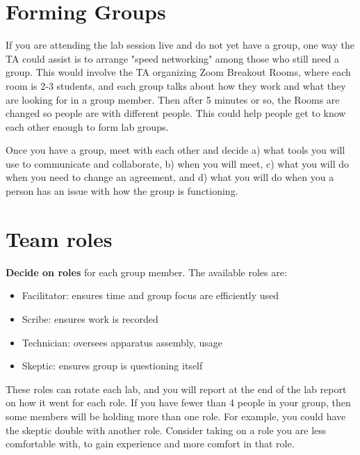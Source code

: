 \section{Forming Groups}

If you are attending the lab session live and do not yet have a group, one way the TA could assist is to arrange "speed networking" among those who still need a group. This would involve the TA organizing Zoom Breakout Rooms, where each room is 2-3 students, and each group talks about how they work and what they are looking for in a group member. Then after 5 minutes or so, the Rooms are changed so people are with different people. This could help people get to know each other enough to form lab groups.

\begin{steps}
	\item Once you have a group, meet with each other and decide a) what tools you will use to communicate and collaborate, b) when you will meet, c) what you will do when you need to change an agreement, and d) what you will do when you a person has an issue with how the group is functioning.
\end{steps}

\section{Team roles}

\textbf{Decide on roles} for each group member. The available roles are:

\begin{itemize}
	\item Facilitator: ensures time and group focus are efficiently used
	\item Scribe: ensures work is recorded
	\item Technician: oversees apparatus assembly, usage
	\item Skeptic: ensures group is questioning itself
\end{itemize}

These roles can rotate each lab, and you will report at the end of the lab report on how it went for each role. If you have fewer than 4 people in your group, then some members will be holding more than one role. For example, you could have the skeptic double with another role. Consider taking on a role you are less comfortable with, to gain experience and more comfort in that role.

